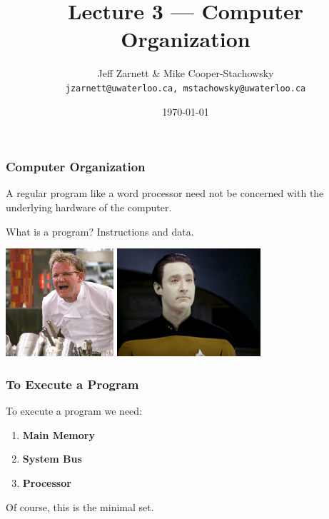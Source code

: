 

\title{Lecture 3 --- Computer Organization}

\author{Jeff Zarnett \& Mike Cooper-Stachowsky \\ \small \texttt{jzarnett@uwaterloo.ca, mstachowsky@uwaterloo.ca}}
\date{\today}



\begin{frame}
  \titlepage

 \end{frame}

\begin{frame}
\frametitle{Computer Organization}

A regular program like a word processor need not be concerned with the underlying hardware of the computer.

What is a program? Instructions and data.
\begin{center}
	\includegraphics[width=0.3\textwidth]{images/instructions.jpg}
	\includegraphics[width=0.4\textwidth]{images/data.jpg}
\end{center}


\end{frame}

\begin{frame}
\frametitle{To Execute a Program}

To execute a program we need:

\begin{enumerate}
	\item \textbf{Main Memory}
	\item \textbf{System Bus}
	\item \textbf{Processor}
\end{enumerate}

Of course, this is the minimal set.

\end{frame}

